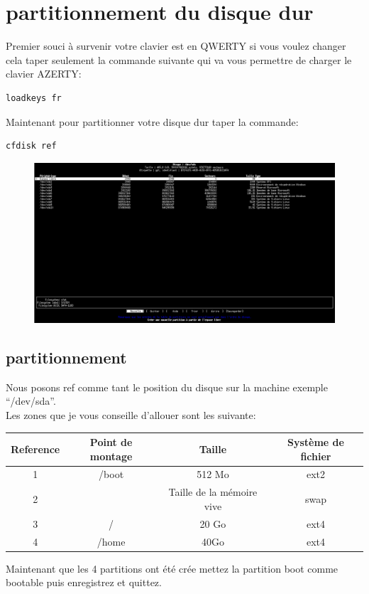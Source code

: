 \documentclass[a4paper]{book}
\begin{document}
\chapter{partitionnement  du disque dur}
Premier souci à survenir votre clavier est en QWERTY si vous voulez changer
cela taper seulement la commande suivante qui va vous permettre de charger le
clavier AZERTY:\\
\begin{lstlisting}
loadkeys fr
\end{lstlisting}
Maintenant pour partitionner votre disque dur taper la commande:\\
\begin{lstlisting}
cfdisk ref
\end{lstlisting}
\begin{figure}[h]
  \includegraphics[width=\textwidth]{images/cfdisk}
\end{figure}
\pagebreak

\section{partitionnement}
Nous posons ref comme tant le position du disque sur la machine exemple
``/dev/sda''.\\
Les zones que je vous conseille d'allouer sont les suivante:\\
\begin{tabular*}{\textwidth}{|c|c|c|c}
  Reference & Point de montage & Taille & Système de fichier\\
  \hline
  1 & /boot & 512 Mo & ext2 \\
  \hline
  2 & & Taille de la mémoire vive & swap \\
  \hline
  3 & / & 20 Go & ext4\\
  \hline
  4 & /home & 40Go & ext4
\end{tabular*}
\newline
Maintenant que les 4 partitions ont été crée mettez la partition boot comme
bootable puis enregistrez et quittez.
\end{document}

